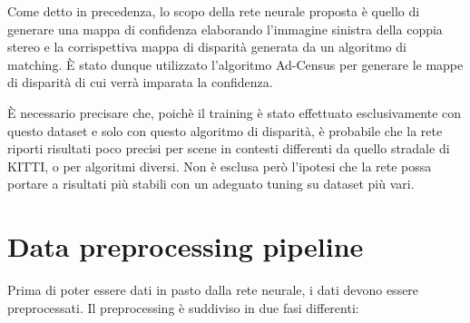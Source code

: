 \documentclass[12pt,a4paper]{report}
\begin{document}
Come detto in precedenza, lo scopo della rete neurale proposta è quello di
generare una mappa di confidenza elaborando l'immagine sinistra della coppia
stereo e la corrispettiva mappa di disparità generata da un algoritmo di
matching. \`E stato dunque utilizzato l'algoritmo Ad-Census \cite{zabih1994non}
per generare le mappe di disparità di cui verrà imparata la confidenza.

\`E necessario precisare che, poichè il training è stato effettuato
esclusivamente con questo dataset e solo con questo algoritmo di disparità,
è probabile che la rete riporti risultati poco precisi per scene in contesti
differenti da quello stradale di KITTI, o per algoritmi diversi.
Non è esclusa però l'ipotesi che la rete possa portare a risultati più stabili
con un adeguato tuning su dataset più vari. 

\section{Data preprocessing pipeline}

Prima di poter essere dati in pasto dalla rete neurale, i dati devono essere
preprocessati.
Il preprocessing è suddiviso in due fasi differenti:
\end{document}
